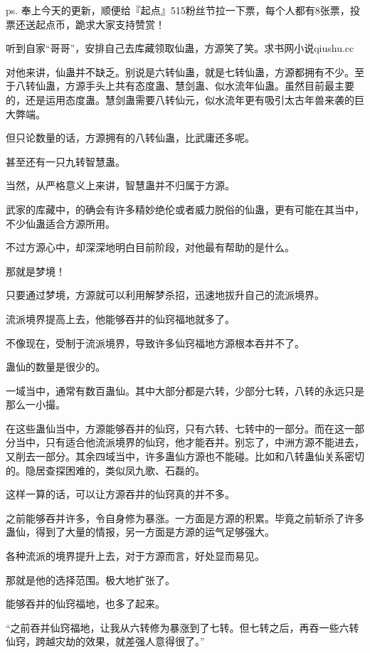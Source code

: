 
\begin{this_body}

ps. 奉上今天的更新，顺便给『起点』515粉丝节拉一下票，每个人都有8张票，投票还送起点币，跪求大家支持赞赏！

听到自家“哥哥”，安排自己去库藏领取仙蛊，方源笑了笑。求书网小说qiushu.cc

对他来讲，仙蛊并不缺乏。别说是六转仙蛊，就是七转仙蛊，方源都拥有不少。至于八转仙蛊，方源手头上共有态度蛊、慧剑蛊、似水流年仙蛊。虽然目前最主要的，还是运用态度蛊。慧剑蛊需要八转仙元，似水流年更有吸引太古年兽来袭的巨大弊端。

但只论数量的话，方源拥有的八转仙蛊，比武庸还多呢。

甚至还有一只九转智慧蛊。

当然，从严格意义上来讲，智慧蛊并不归属于方源。

武家的库藏中，的确会有许多精妙绝伦或者威力脱俗的仙蛊，更有可能在其当中，不少仙蛊适合方源所用。

不过方源心中，却深深地明白目前阶段，对他最有帮助的是什么。

那就是梦境！

只要通过梦境，方源就可以利用解梦杀招，迅速地拔升自己的流派境界。

流派境界提高上去，他能够吞并的仙窍福地就多了。

不像现在，受制于流派境界，导致许多仙窍福地方源根本吞并不了。

蛊仙的数量是很少的。

一域当中，通常有数百蛊仙。其中大部分都是六转，少部分七转，八转的永远只是那么一小撮。

在这些蛊仙当中，方源能够吞并的仙窍，只有六转、七转中的一部分。而在这一部分当中，只有适合他流派境界的仙窍，他才能吞并。别忘了，中洲方源不能进去，又削去一部分。其余四域当中，许多蛊仙方源也不能碰。比如和八转蛊仙关系密切的。隐居查探困难的，类似凤九歌、石磊的。

这样一算的话，可以让方源吞并的仙窍真的并不多。

之前能够吞并许多，令自身修为暴涨。一方面是方源的积累。毕竟之前斩杀了许多蛊仙，得到了大量的情报，另一方面是方源的运气足够强大。

各种流派的境界提升上去，对于方源而言，好处显而易见。

那就是他的选择范围。极大地扩张了。

能够吞并的仙窍福地，也多了起来。

“之前吞并仙窍福地，让我从六转修为暴涨到了七转。但七转之后，再吞一些六转仙窍，跨越灾劫的效果，就差强人意得很了。”


\end{this_body}
